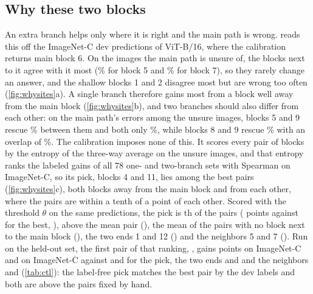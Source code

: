 \documentclass{article}
\begin{document}
\subsection{Why these two blocks}
\label{app:why}
An extra branch helps only where it is right and the main path is wrong.  reads this off the ImageNet-C dev predictions of ViT-B/16, where the calibration returns main block 6. On the images the main path is unsure of, the blocks next to it agree with it most (\% for block 5 and \% for block 7), so they rarely change an answer, and the shallow blocks 1 and 2 disagree most but are wrong too often (\cref{fig:whysites}a). A single branch therefore gains most from a block well away from the main block (\cref{fig:whysites}b), and two branches should also differ from each other: on the main path's errors among the unsure images, blocks 5 and 9 rescue \% between them and both only \%, while blocks 8 and 9 rescue \% with an overlap of \%. The calibration imposes none of this. It scores every pair of blocks by the entropy of the three-way average on the unsure images, and that entropy ranks the labeled gains of all 78 one- and two-branch sets with Spearman  on ImageNet-C, so its pick, blocks 4 and 11, lies among the best pairs (\cref{fig:whysites}c), both blocks away from the main block and from each other, where the pairs are within a tenth of a point of each other. Scored with the threshold $\theta$ on the same predictions, the pick is th of the  pairs ( points against  for the best, ), above the mean pair (), the mean of the  pairs with no block next to the main block (), the two ends 1 and 12 () and the neighbors 5 and 7 (). Run on the held-out set, the first pair of that ranking, , gains  points on ImageNet-C and  on ImageNet-$\overline{\text{C}}$ against  and  for the pick, the two ends  and  and the neighbors  and  (\cref{tab:ctl}): the label-free pick matches the best pair by the dev labels and both are above the pairs fixed by hand.
\end{document}
